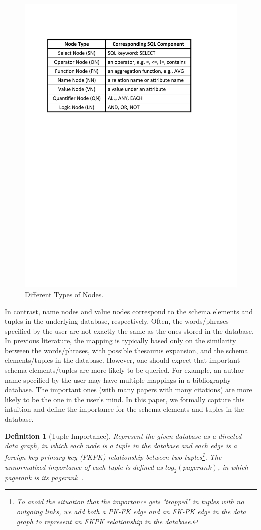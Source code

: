\documentclass{vldb}
\newtheorem{definition}{Definition}
\begin{document}
\begin{figure}[h]
  \center
  \includegraphics[width=0.8\linewidth]{pic/nodeType.pdf}
  \caption{Different Types of Nodes.}
  \label{fig:nodeType}
\end{figure}

In contrast, name nodes and value nodes correspond to the schema elements and tuples in the underlying database, respectively.  Often, the words/phrases specified by the user are not exactly the same as the ones stored in the database.  In previous literature, the mapping is typically based only on the similarity between the words/phrases, with possible thesaurus expansion,  and the schema elements/tuples in the database.  However, one should expect that important schema elements/tuples are more likely to be queried.  For example, an author name specified by the user may have multiple mappings in a bibliography database.  The important ones (with many papers with many citations) are more likely to be the one in the user's mind.  In this paper, we formally capture this intuition and define the importance for the schema elements and tuples in the database.  

\begin{definition}[Tuple Importance]
Represent the given database as a directed data graph, in which each node is a tuple in the database and each edge is a foreign-key-primary-key (FKPK) relationship between two tuples\footnote{To avoid the situation that the importance gets "trapped" in tuples with no outgoing links, we add both a PK-FK edge and an FK-PK edge in the data graph to represent an FKPK relationship in the database.}.   The unnormalized importance of each tuple is defined as $log_{2} (pagerank)$, in which pagerank is its pagerank~\cite{Page99thepagerank}.  
\end{definition}
\end{document}
